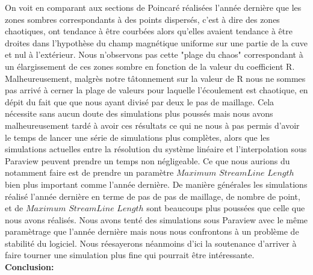 \documentclass[a4paper,12pt,titlepage]{report}
\begin{document}
\begin{onehalfspace}
On voit en comparant aux sections de Poincaré réalisées l'année dernière que les zones sombres correspondants à des points dispersés, c'est à dire des zones chaotiques, ont tendance à être courbées alors qu'elles avaient tendance à être droites dans l'hypothèse du champ magnétique uniforme sur une partie de la cuve et nul à l'extérieur.
Nous n'observons pas cette "plage du chaos" correspondant à un élargissement de ces zones sombre en fonction de la valeur du coefficient R.
Malheureusement, malgrès notre tâtonnement sur la valeur de R nous ne sommes pas arrivé à cerner la plage de valeurs pour laquelle l'écoulement est chaotique, en dépit du fait que  que nous ayant divisé par deux le pas de maillage. Cela nécessite sans aucun doute des simulations plus poussés mais nous avons malheureusement tardé à avoir ces résultats ce qui ne nous à pas permis d'avoir le temps de lancer une série de simulations plus complètes, alors que les simulations actuelles entre la résolution du système linéaire et l'interpolation sous Paraview peuvent prendre un temps non négligeable. Ce que nous aurions du notamment faire est de prendre un paramètre $Maximum$ $StreamLine$ $Length$ bien plus important comme l'année dernière. De manière générales les simulations réalisé l'année dernière en terme de pas de pas de maillage, de nombre de point, et de $Maximum$ $StreamLine$ $Length$ sont beaucoups plus poussées que celle que nous avons réalisés. Nous avons tenté des simulations sous Paraview avec le même paramètrage que l'année dernière mais nous nous confrontons à un problème de stabilité du logiciel.
Nous réesayerons néanmoins d'ici la soutenance d'arriver à faire tourner une simulation plus fine qui pourrait être intéressante.\\
\newpage
\newpage
\textbf{\Huge Conclusion:}
\normalsize
\\


\end{onehalfspace}
\end{document}
